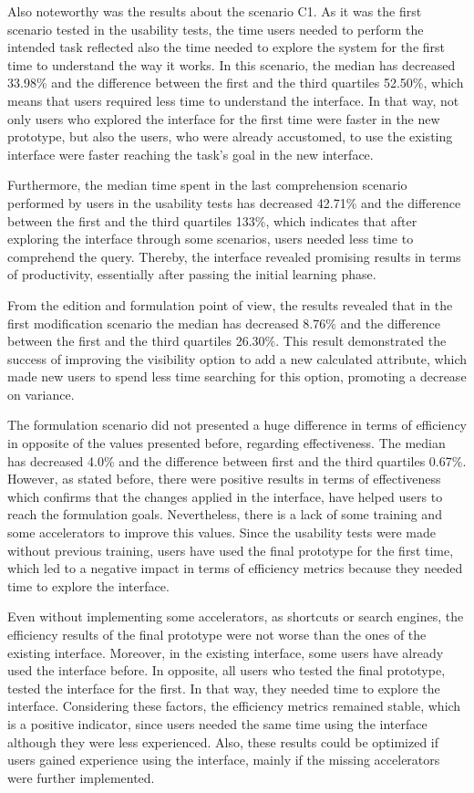 Also noteworthy was the results about the scenario C1. As it was the first scenario tested in the usability tests, the time users needed to perform the intended task reflected also the time needed to explore the system for the first time to understand the way it works. In this scenario, the median has decreased 33.98\% and the difference between the first and the third quartiles 52.50\%, which means that users required less time to understand the interface. In that way, not only users who explored the interface for the first time were faster in the new prototype, but also the users, who were already accustomed, to use the existing interface were faster reaching the task's goal in the new interface.

Furthermore, the median time spent in the last comprehension scenario performed by users in the usability tests has decreased 42.71\% and the difference between the first and the third quartiles 133\%, which indicates that after exploring the interface through some scenarios, users needed less time to comprehend the query. Thereby, the interface revealed promising results in terms of productivity, essentially after passing the initial learning phase.

From the edition and formulation point of view, the results revealed that in the first modification scenario the median has decreased 8.76\% and the difference between the first and the third quartiles 26.30\%. This result demonstrated the success of improving the visibility option to add a new calculated attribute, which made new users to spend less time searching for this option, promoting a decrease on variance.

The formulation scenario did not presented a huge difference in terms of efficiency in opposite of the values presented before, regarding effectiveness. The median has decreased 4.0\% and the difference between first and the third quartiles 0.67\%. However, as stated before, there were positive results in terms of effectiveness which confirms that the changes applied in the interface, have helped users to reach the formulation goals. Nevertheless, there is a lack of some training and some accelerators to improve this values. Since the usability tests were made without previous training, users have used the final prototype for the first time, which led to a negative impact in terms of efficiency metrics because they needed time to explore the interface. 

Even without implementing some accelerators, as shortcuts or search engines, the efficiency results of the final prototype were not worse than the ones of the existing interface. Moreover, in the existing interface, some users have already used the interface before. In opposite, all users who tested the final prototype, tested the interface for the first. In that way, they needed time to explore the interface. Considering these factors, the efficiency metrics remained stable, which is a positive indicator, since users needed the same time using the interface although they were less experienced. Also, these results could be optimized if users gained experience using the interface, mainly if the missing accelerators were further implemented.

